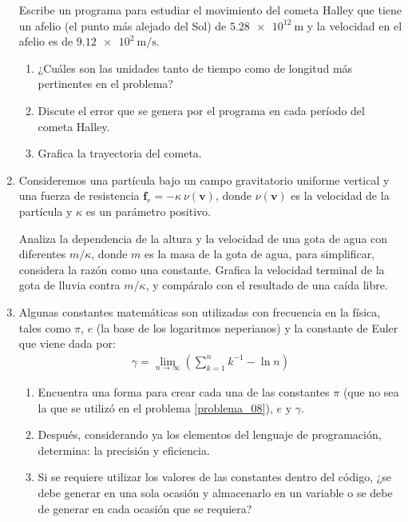 \begin{enumerate}
Escribe un programa para estudiar el movimiento del cometa Halley que tiene un afelio (el punto más alejado del Sol) de $\SI{5.28e12}{\meter}$ y la velocidad en el afelio es de $\SI{9.12e2}{\meter\per\second}$.
\begin{enumerate}
\item ¿Cuáles son las unidades tanto de tiempo como de longitud más pertinentes en el problema?
\item Discute el error que se genera por el programa en cada período del cometa Halley.
\item Grafica la trayectoria del cometa.
\end{enumerate}
\item Consideremos una partícula bajo un campo gravitatorio uniforme vertical y una fuerza de resistencia $\mathbf{f}_{r} = - \kappa \: \nu(\mathbf{v})$, donde $\nu(\mathbf{v})$ es la velocidad de la partícula y $\kappa$ es un parámetro positivo.
\par
Analiza la dependencia de la altura y la velocidad de una gota de agua con diferentes $m/\kappa$, donde $m$ es la masa de la gota de agua, para simplificar, considera la razón como una constante. Grafica la velocidad terminal de la gota de lluvia contra $m/\kappa$, y compáralo con el resultado de una caída libre.
\item Algunas constantes matemáticas son utilizadas con frecuencia en la física, tales como $\pi$, $e$ (la base de los logaritmos neperianos) y la constante de Euler que viene dada por:
\begin{align*}
\gamma = \lim_{n \rightarrow \infty} \left( \sum_{k = 1}^{n} k^{ - 1} - \ln n \right)
\end{align*}
\begin{enumerate}
\item Encuentra una forma para crear cada una de las constantes $\pi$ (que no sea la que se utilizó en el problema \ref{problema_08}), $e$ y $\gamma$.
\item Después, considerando ya los elementos del lenguaje de programación, determina: la precisión y eficiencia. 
\item Si se requiere utilizar los valores de las constantes dentro del código, ¿se debe generar en una sola ocasión y almacenarlo en un variable o se debe de generar en cada ocasión que se requiera?
\end{enumerate}
\end{enumerate}

